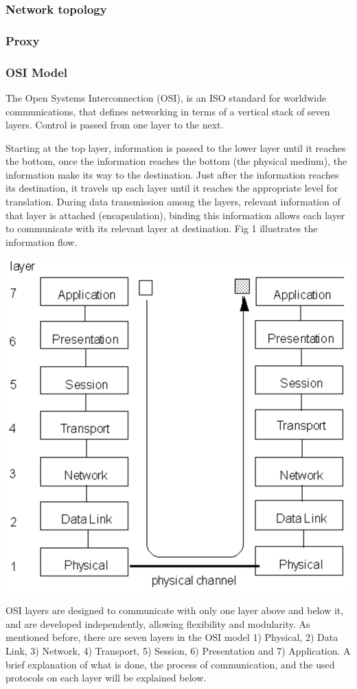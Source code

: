 \documentclass{article}
\begin{document}
\subsubsection{Network topology} %

\subsubsection{Proxy} %

\subsubsection{OSI Model} %
The Open Systems Interconnection (OSI), is an ISO standard for worldwide communications, that defines networking in terms of a vertical stack of seven layers. Control is passed from one layer to the next.

Starting at the top layer, information is passed to the lower layer until it reaches the bottom, once the information reaches the bottom (the physical medium), the information make its way to the destination. Just after the information reaches its destination, it travels up each layer until it reaches the appropriate level for translation. During data transmission among the layers, relevant information of that layer is attached (encapsulation), binding this information allows each layer to communicate with its relevant layer at destination. Fig 1 illustrates the information flow.

	\begin{center}\includegraphics[scale=0.4]{osi} \end{center}
OSI layers are designed to communicate with only one layer above and below it, and are developed independently, allowing flexibility and modularity. As mentioned before, there are seven layers in the OSI model 1) Physical, 2) Data Link, 3) Network, 4) Transport, 5) Session, 6) Presentation and 7) Application. A brief explanation of what is done, the process of communication, and the used protocols on each layer will be explained below.
\end{document}
